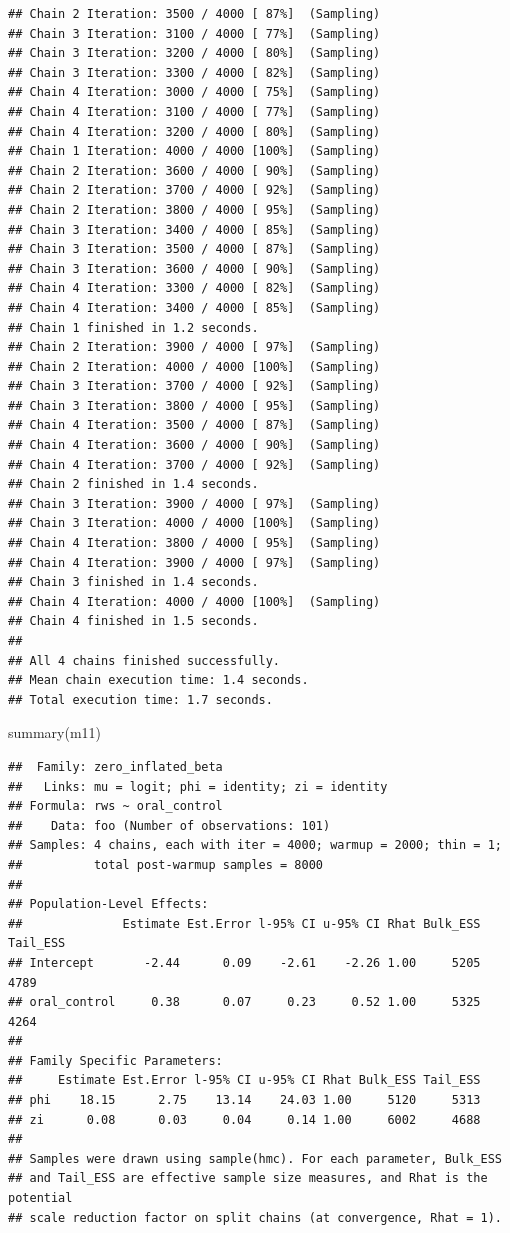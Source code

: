 \documentclass[
]{article}
\newenvironment{Shaded}{\begin{snugshade}}{\end{snugshade}}
\newcommand{\FunctionTok}[1]{\textcolor[rgb]{0.00,0.00,0.00}{#1}}
\newcommand{\NormalTok}[1]{#1}
\begin{document}
\begin{verbatim}
## Chain 2 Iteration: 3500 / 4000 [ 87%]  (Sampling) 
## Chain 3 Iteration: 3100 / 4000 [ 77%]  (Sampling) 
## Chain 3 Iteration: 3200 / 4000 [ 80%]  (Sampling) 
## Chain 3 Iteration: 3300 / 4000 [ 82%]  (Sampling) 
## Chain 4 Iteration: 3000 / 4000 [ 75%]  (Sampling) 
## Chain 4 Iteration: 3100 / 4000 [ 77%]  (Sampling) 
## Chain 4 Iteration: 3200 / 4000 [ 80%]  (Sampling) 
## Chain 1 Iteration: 4000 / 4000 [100%]  (Sampling) 
## Chain 2 Iteration: 3600 / 4000 [ 90%]  (Sampling) 
## Chain 2 Iteration: 3700 / 4000 [ 92%]  (Sampling) 
## Chain 2 Iteration: 3800 / 4000 [ 95%]  (Sampling) 
## Chain 3 Iteration: 3400 / 4000 [ 85%]  (Sampling) 
## Chain 3 Iteration: 3500 / 4000 [ 87%]  (Sampling) 
## Chain 3 Iteration: 3600 / 4000 [ 90%]  (Sampling) 
## Chain 4 Iteration: 3300 / 4000 [ 82%]  (Sampling) 
## Chain 4 Iteration: 3400 / 4000 [ 85%]  (Sampling) 
## Chain 1 finished in 1.2 seconds.
## Chain 2 Iteration: 3900 / 4000 [ 97%]  (Sampling) 
## Chain 2 Iteration: 4000 / 4000 [100%]  (Sampling) 
## Chain 3 Iteration: 3700 / 4000 [ 92%]  (Sampling) 
## Chain 3 Iteration: 3800 / 4000 [ 95%]  (Sampling) 
## Chain 4 Iteration: 3500 / 4000 [ 87%]  (Sampling) 
## Chain 4 Iteration: 3600 / 4000 [ 90%]  (Sampling) 
## Chain 4 Iteration: 3700 / 4000 [ 92%]  (Sampling) 
## Chain 2 finished in 1.4 seconds.
## Chain 3 Iteration: 3900 / 4000 [ 97%]  (Sampling) 
## Chain 3 Iteration: 4000 / 4000 [100%]  (Sampling) 
## Chain 4 Iteration: 3800 / 4000 [ 95%]  (Sampling) 
## Chain 4 Iteration: 3900 / 4000 [ 97%]  (Sampling) 
## Chain 3 finished in 1.4 seconds.
## Chain 4 Iteration: 4000 / 4000 [100%]  (Sampling) 
## Chain 4 finished in 1.5 seconds.
## 
## All 4 chains finished successfully.
## Mean chain execution time: 1.4 seconds.
## Total execution time: 1.7 seconds.
\end{verbatim}

\begin{Shaded}
\begin{Highlighting}[]
\FunctionTok{summary}\NormalTok{(m11)}
\end{Highlighting}
\end{Shaded}

\begin{verbatim}
##  Family: zero_inflated_beta 
##   Links: mu = logit; phi = identity; zi = identity 
## Formula: rws ~ oral_control 
##    Data: foo (Number of observations: 101) 
## Samples: 4 chains, each with iter = 4000; warmup = 2000; thin = 1;
##          total post-warmup samples = 8000
## 
## Population-Level Effects: 
##              Estimate Est.Error l-95% CI u-95% CI Rhat Bulk_ESS Tail_ESS
## Intercept       -2.44      0.09    -2.61    -2.26 1.00     5205     4789
## oral_control     0.38      0.07     0.23     0.52 1.00     5325     4264
## 
## Family Specific Parameters: 
##     Estimate Est.Error l-95% CI u-95% CI Rhat Bulk_ESS Tail_ESS
## phi    18.15      2.75    13.14    24.03 1.00     5120     5313
## zi      0.08      0.03     0.04     0.14 1.00     6002     4688
## 
## Samples were drawn using sample(hmc). For each parameter, Bulk_ESS
## and Tail_ESS are effective sample size measures, and Rhat is the potential
## scale reduction factor on split chains (at convergence, Rhat = 1).
\end{verbatim}
\end{document}
